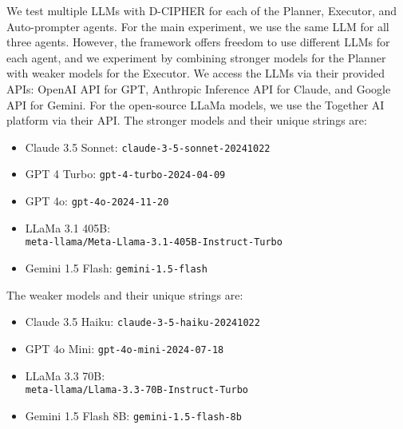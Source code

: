 We test multiple LLMs with D-CIPHER for each of the Planner, Executor, and Auto-prompter agents. 
For the main experiment, we use the same LLM for all three agents.
However, the framework offers freedom to use different LLMs for each agent, and we experiment by combining stronger models for the Planner with weaker models for the Executor.
We access the LLMs via their provided APIs: OpenAI API for GPT, Anthropic Inference API for Claude, and Google API for Gemini. For the open-source LLaMa models, we use the  Together AI platform \cite{togetherai} via their API.
The stronger models and their unique strings are:
\begin{itemize}
    \item Claude 3.5 Sonnet: \texttt{claude-3-5-sonnet-20241022}
    \item GPT 4 Turbo: \texttt{gpt-4-turbo-2024-04-09}
    \item GPT 4o: \texttt{gpt-4o-2024-11-20}
    \item LLaMa 3.1 405B: \\
        \texttt{meta-llama/Meta-Llama-3.1-405B-Instruct-Turbo}
    \item Gemini 1.5 Flash: \texttt{gemini-1.5-flash}
\end{itemize}
The weaker models and their unique strings are:
\begin{itemize}
    \item Claude 3.5 Haiku: \texttt{claude-3-5-haiku-20241022}
    \item GPT 4o Mini: \texttt{gpt-4o-mini-2024-07-18}
    \item LLaMa 3.3 70B: \\
    \texttt{meta-llama/Llama-3.3-70B-Instruct-Turbo}
    \item Gemini 1.5 Flash 8B: \texttt{gemini-1.5-flash-8b}
\end{itemize}


